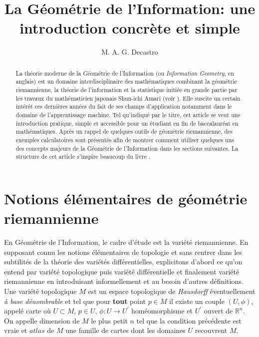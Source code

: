 \documentclass[11pt, letterpaper]{article}
\date{}
\title{\textbf{\color{blue}La Géométrie de l'Information: une introduction concrète et simple}}
\author{M. A. G. Decastro\\}
\begin{document}
	\maketitle
	
	\renewcommand{\abstractname}{Résumé}
		
	\begin{abstract}
	La théorie moderne de la Géométrie de l'Information (ou \textit{Information Geometry}, en anglais) est un domaine interdisciplinaire des mathématiques combinant la géométrie riemannienne, la théorie de l'information et la statistique initiée en grande partie par les travaux du mathématicien japonais Shun-ichi Amari (voir \cite{amari1985differential}). Elle suscite un certain intérêt ces dernières années du fait de ses champs d'application notamment dans le domaine de l'apprentissage machine. Tel qu'indiqué par le titre, cet article se veut une introduction pratique, simple et accessible pour un étudiant en fin de baccalauréat en mathématiques. Après un rappel de quelques outils de géométrie riemannienne, des exemples calculatoires sont présentés afin de montrer comment utiliser quelques uns des concepts majeurs de la Géométrie de l'Information dans les sections suivantes. La structure de cet article s'inspire beaucoup du livre \cite{calin2014geometric}.
		 	
	\end{abstract}
	\nocite{*}
	\section{Notions élémentaires de géométrie riemannienne}
	En Géométrie de l'Information, le cadre d'étude est la variété riemannienne. En supposant connu les notions élémentaires de topologie et sans rentrer dans les subtilités de la théorie des variétés différentielles, explicitons d'abord ce qu'on entend par variété topologique puis variété différentielle et finalement variété riemannienne en introduisant informellement et au besoin d'autres définitions.\\
	
	Une variété topologique $M$ est un espace topologique de \textit{Hausdorff} éventuellement \textit{à base dénombrable} et tel que pour \textbf{tout} point $p\in M$ il existe un couple $(U, \phi)$, appelé carte où $U\subset M$, $p \in U$, $\phi:U \longrightarrow U^{'}$ homéomorphisme et $U^{'}$ ouvert de $\mathbb{R}^{n}$.  
	On appelle dimension de $M$ le plus petit $n$ tel que la condition précédente est vraie et $atlas$ de $M$ une famille de cartes dont les domaines $U$ recouvrent $M$.
	
\end{document}

